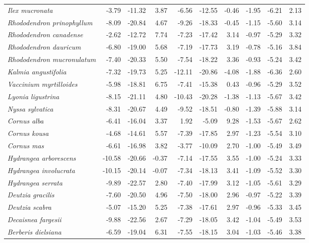 \documentclass[11pt]{article}
\begin{document}
\begin{longtable}{lrrrrrrrrr}
  \emph{Ilex mucronata} & -3.79 & -11.32 & 3.87 & -6.56 & -12.55 & -0.46 & -1.95 & -6.21 & 2.13 \\ 
  \emph{Rhododendron prinophyllum} & -8.09 & -20.84 & 4.67 & -9.26 & -18.33 & -0.45 & -1.15 & -5.60 & 3.14 \\ 
  \emph{Rhododendron canadense} & -2.62 & -12.72 & 7.74 & -7.23 & -17.42 & 3.14 & -0.97 & -5.29 & 3.32 \\ 
  \emph{Rhododendron dauricum} & -6.80 & -19.00 & 5.68 & -7.19 & -17.73 & 3.19 & -0.78 & -5.16 & 3.84 \\ 
  \emph{Rhododendron mucronulatum} & -7.40 & -20.33 & 5.50 & -7.54 & -18.22 & 3.36 & -0.93 & -5.24 & 3.42 \\ 
  \emph{Kalmia angustifolia} & -7.32 & -19.73 & 5.25 & -12.11 & -20.86 & -4.08 & -1.88 & -6.36 & 2.60 \\ 
  \emph{Vaccinium myrtilloides} & -5.98 & -18.81 & 6.75 & -7.41 & -15.38 & 0.43 & -0.96 & -5.29 & 3.52 \\ 
  \emph{Lyonia ligustrina} & -8.15 & -21.11 & 4.80 & -10.43 & -20.28 & -1.38 & -1.13 & -5.67 & 3.42 \\ 
  \emph{Nyssa sylvatica} & -8.31 & -20.67 & 4.49 & -9.52 & -18.51 & -0.80 & -1.39 & -5.88 & 3.14 \\ 
  \emph{Cornus alba} & -6.41 & -16.04 & 3.37 & 1.92 & -5.09 & 9.28 & -1.53 & -5.67 & 2.62 \\ 
  \emph{Cornus kousa} & -4.68 & -14.61 & 5.57 & -7.39 & -17.85 & 2.97 & -1.23 & -5.54 & 3.10 \\ 
  \emph{Cornus mas} & -6.61 & -16.98 & 3.82 & -3.77 & -10.09 & 2.70 & -1.00 & -5.49 & 3.49 \\ 
  \emph{Hydrangea arborescens} & -10.58 & -20.66 & -0.37 & -7.14 & -17.55 & 3.55 & -1.00 & -5.24 & 3.33 \\ 
  \emph{Hydrangea involucrata} & -10.15 & -20.14 & -0.07 & -7.34 & -18.13 & 3.41 & -1.09 & -5.52 & 3.30 \\ 
  \emph{Hydrangea serrata} & -9.89 & -22.57 & 2.80 & -7.40 & -17.99 & 3.12 & -1.05 & -5.61 & 3.29 \\ 
  \emph{Deutzia gracilis} & -7.60 & -20.50 & 4.96 & -7.50 & -18.00 & 2.96 & -0.97 & -5.22 & 3.39 \\ 
  \emph{Deutzia scabra} & -5.07 & -15.20 & 5.25 & -7.38 & -17.61 & 2.97 & -0.96 & -5.33 & 3.45 \\ 
  \emph{Decaisnea fargesii} & -9.88 & -22.56 & 2.67 & -7.29 & -18.05 & 3.42 & -1.04 & -5.49 & 3.53 \\ 
  \emph{Berberis dielsiana} & -6.59 & -19.04 & 6.31 & -7.55 & -18.15 & 3.04 & -1.03 & -5.46 & 3.38 \\ 

\end{longtable}
\end{document}
